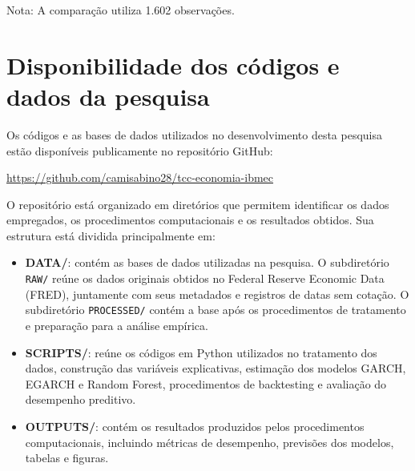 \begin{table}[H]
    \centering
    \caption{Resultados completos do teste Diebold–Mariano para QLIKE --- janela rolante}
    \label{tab:dm_qlike_rolante_completo}
    \small
    \par\vspace{2pt}
    {\footnotesize Nota: A comparação utiliza 1.602 observações.\par}
\end{table}

\chapter{Disponibilidade dos códigos e dados da pesquisa}
\label{ap:repositorio}

Os códigos e as bases de dados utilizados no desenvolvimento desta pesquisa estão disponíveis publicamente no repositório GitHub:

\begin{center}
    \url{https://github.com/camisabino28/tcc-economia-ibmec}
\end{center}

O repositório está organizado em diretórios que permitem identificar os dados empregados, os procedimentos computacionais e os resultados obtidos. Sua estrutura está dividida principalmente em:

\begin{itemize}
    \item \textbf{DATA/}: contém as bases de dados utilizadas na pesquisa. O subdiretório \texttt{RAW/} reúne os dados originais obtidos no Federal Reserve Economic Data (FRED), juntamente com seus metadados e registros de datas sem cotação. O subdiretório \texttt{PROCESSED/} contém a base após os procedimentos de tratamento e preparação para a análise empírica.

    \item \textbf{SCRIPTS/}: reúne os códigos em Python utilizados no tratamento dos dados, construção das variáveis explicativas, estimação dos modelos GARCH, EGARCH e Random Forest, procedimentos de backtesting e avaliação do desempenho preditivo.

    \item \textbf{OUTPUTS/}: contém os resultados produzidos pelos procedimentos computacionais, incluindo métricas de desempenho, previsões dos modelos, tabelas e figuras.
\end{itemize}

